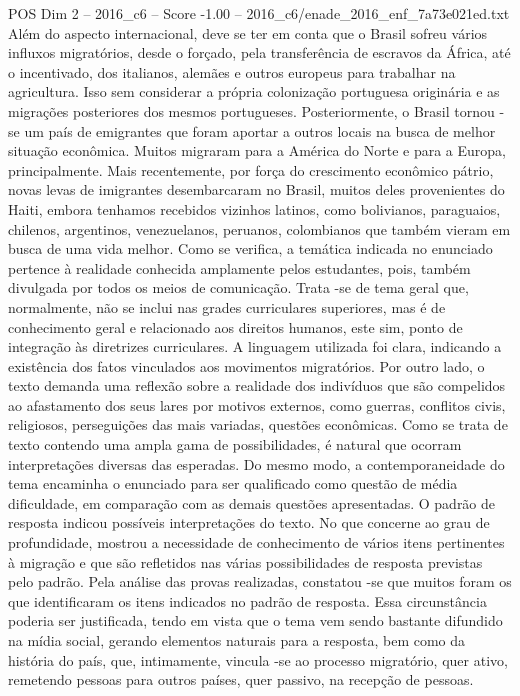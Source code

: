 \begin{textsample}{POS Dim 2 – 2016\_c6 – Score -1.00 – 2016\_c6/enade\_2016\_enf\_7a73e021ed.txt}
Além do aspecto internacional, deve se ter em conta que o Brasil sofreu vários influxos migratórios, desde o forçado, pela transferência de escravos da África, até o incentivado, dos italianos, alemães e outros europeus para trabalhar na agricultura.
Isso sem considerar a própria colonização portuguesa originária e as migrações posteriores dos mesmos portugueses.
Posteriormente, o Brasil tornou -se um país de emigrantes que foram aportar a outros locais na busca de melhor situação econômica.
Muitos migraram para a América do Norte e para a Europa, principalmente.
Mais recentemente, por força do crescimento econômico pátrio, novas levas de imigrantes desembarcaram no Brasil, muitos deles provenientes do Haiti, embora tenhamos recebidos vizinhos latinos, como bolivianos, paraguaios, chilenos, argentinos, venezuelanos, peruanos, colombianos que também vieram em busca de uma vida melhor.
Como se verifica, a temática indicada no enunciado pertence à realidade conhecida amplamente pelos estudantes, pois, também divulgada por todos os meios de comunicação.
Trata -se de tema geral que, normalmente, não se inclui nas grades curriculares superiores, mas é de conhecimento geral e relacionado aos direitos humanos, este sim, ponto de integração às diretrizes curriculares.
A linguagem utilizada foi clara, indicando a existência dos fatos vinculados aos movimentos migratórios.
Por outro lado, o texto demanda uma reflexão sobre a realidade dos indivíduos que são compelidos ao afastamento dos seus lares por motivos externos, como guerras, conflitos civis, religiosos, perseguições das mais variadas, questões econômicas.
Como se trata de texto contendo uma ampla gama de possibilidades, é natural que ocorram interpretações diversas das esperadas.
Do mesmo modo, a contemporaneidade do tema encaminha o enunciado para ser qualificado como questão de média dificuldade, em comparação com as demais questões apresentadas.
O padrão de resposta indicou possíveis interpretações do texto.
No que concerne ao grau de profundidade, mostrou a necessidade de conhecimento de vários itens pertinentes à migração e que são refletidos nas várias possibilidades de resposta previstas pelo padrão.
Pela análise das provas realizadas, constatou -se que muitos foram os que identificaram os itens indicados no padrão de resposta.
Essa circunstância poderia ser justificada, tendo em vista que o tema vem sendo bastante difundido na mídia social, gerando elementos naturais para a resposta, bem como da história do país, que, intimamente, vincula -se ao processo migratório, quer ativo, remetendo pessoas para outros países, quer passivo, na recepção de pessoas.

\end{textsample}
